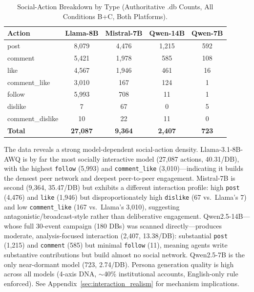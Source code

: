 \documentclass[11pt,journal,onecolumn]{IEEEtran}
\begin{document}
\begin{table}[!htbp]
\centering
\caption{Social-Action Breakdown by Type (Authoritative .db Counts, All Conditions B+C, Both Platforms).}
\label{tab:action_breakdown}
\small
\begin{tabular}{lcccc}
\toprule
\textbf{Action} & \textbf{Llama-8B} & \textbf{Mistral-7B} & \textbf{Qwen-14B} & \textbf{Qwen-7B} \\
\midrule
post             & 8,079  & 4,476  & 1,215 & 592 \\
comment          & 5,421  & 1,978  & 585   & 108 \\
like             & 4,567  & 1,946  & 461   & 16  \\
comment\_like    & 3,010  & 167    & 124   & 1   \\
follow           & 5,993  & 708    & 11    & 1   \\
dislike          & 7      & 67     & 0     & 5   \\
comment\_dislike & 10     & 22     & 11    & 0   \\
\midrule
\textbf{Total}   & \textbf{27,087} & \textbf{9,364} & \textbf{2,407} & \textbf{723} \\
\bottomrule
\end{tabular}
\setlength{\tabcolsep}{6pt}
\end{table}

The data reveals a strong model-dependent social-action density. Llama-3.1-8B-AWQ is by far the most socially interactive model (27,087 actions, 40.31/DB), with the highest \texttt{follow} (5,993) and \texttt{comment\_like} (3,010)---indicating it builds the densest peer network and deepest peer-to-peer engagement. Mistral-7B is second (9,364, 35.47/DB) but exhibits a different interaction profile: high \texttt{post} (4,476) and \texttt{like} (1,946) but disproportionately high \texttt{dislike} (67 vs.\ Llama's 7) and low \texttt{comment\_like} (167 vs.\ Llama's 3,010), suggesting antagonistic/\allowbreak broadcast-style rather than deliberative engagement. Qwen2.5-14B---whose full 30-event campaign (180 DBs) was scanned directly---produces moderate, analysis-focused interaction (2,407, 13.38/DB): substantial \texttt{post} (1,215) and \texttt{comment} (585) but minimal \texttt{follow} (11), meaning agents write substantive contributions but build almost no social network. Qwen2.5-7B is the only near-dormant model (723, 2.74/DB). Persona generation quality is high across all models (4-axis DNA, $\sim$40\% institutional accounts, English-only rule enforced). See Appendix~\ref{sec:interaction_realism} for mechanism implications.
\end{document}
